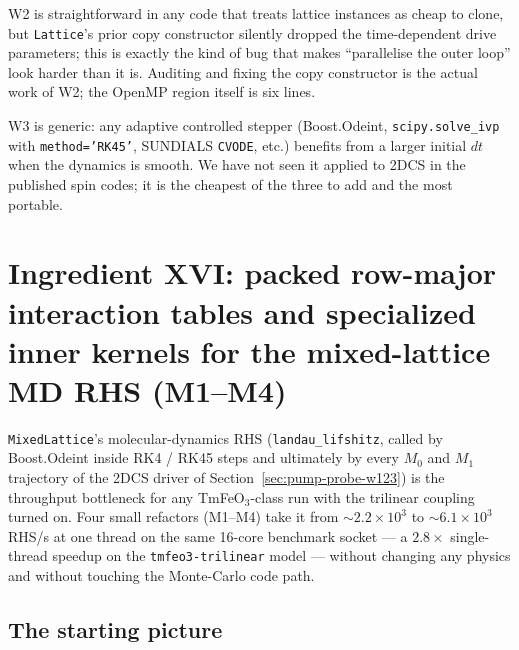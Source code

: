 \documentclass[11pt,letterpaper]{article}
\begin{document}
W2 is straightforward in any code that treats lattice instances
as cheap to clone, but \texttt{Lattice}'s prior copy constructor
silently dropped the time-dependent drive parameters; this is
exactly the kind of bug that makes ``parallelise the outer loop''
look harder than it is.  Auditing and fixing the copy constructor
is the actual work of W2; the OpenMP region itself is six lines.

W3 is generic: any adaptive controlled stepper (Boost.Odeint,
\texttt{scipy.solve\_ivp} with \texttt{method='RK45'},
\textsc{SUNDIALS} \texttt{CVODE}, etc.) benefits from a larger
initial $dt$ when the dynamics is smooth.  We have not seen it
applied to 2DCS in the published spin codes; it is the cheapest
of the three to add and the most portable.

\section{Ingredient XVI: packed row-major interaction tables and
         specialized inner kernels for the mixed-lattice MD RHS
         (M1--M4)}
\label{sec:packed-mixed-rhs}

\texttt{MixedLattice}'s molecular-dynamics RHS
(\texttt{landau\_lifshitz}, called by Boost.Odeint inside RK4 / RK45
steps and ultimately by every $M_0$ and $M_1$ trajectory of the 2DCS
driver of Section~\ref{sec:pump-probe-w123}) is the throughput
bottleneck for any TmFeO$_3$-class run with the trilinear coupling
turned on.  Four small refactors (M1--M4) take it from $\sim 2.2 \times
10^3$ to $\sim 6.1 \times 10^3$ RHS/s at one thread on the same 16-core
benchmark socket --- a $2.8\times$ single-thread speedup on the
\texttt{tmfeo3-trilinear} model --- without changing any physics and
without touching the Monte-Carlo code path.

\subsection{The starting picture}
\end{document}
